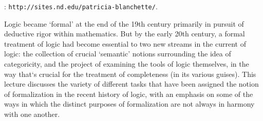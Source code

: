 \documentclass[bsl,meeting]{asl}
\def\urladdr#1{\endgraf\noindent{\it URL Address}: {\tt #1}.}
\newcommand{\NP}{}
\begin{document}
\thispagestyle{empty}

\NP%
%
%
%
%

\urladdr{http://sites.nd.edu/patricia-blanchette/}

Logic became `formal' at the end of the 19th century primarily in pursuit of deductive rigor within mathematics. But by the early 20th century, a formal treatment of logic had become essential to two new streams in the current of logic: the collection of crucial `semantic' notions surrounding the idea of categoricity, and the project of examining the tools of logic themselves, in the way that`s crucial for the treatment of completeness (in its various guises). This lecture discusses the variety of different tasks that have been assigned the notion of formalization in the recent history of logic, with an emphasis on some of the ways in which the distinct purposes of formalization are not always in harmony with one another.
\end{document}
